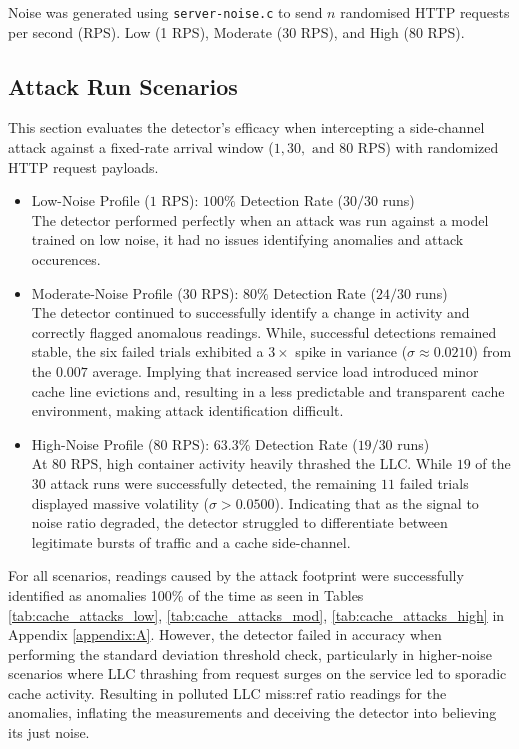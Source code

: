 \documentclass[11pt,a4paper, notitlepage]{article}
\begin{document}
Noise was generated using \texttt{server-noise.c} to send $n$ randomised HTTP requests per second (RPS). Low (1 RPS), Moderate (30 RPS), and High (80 RPS).

\subsection{Attack Run Scenarios}
This section evaluates the detector's efficacy when intercepting a side-channel attack against a fixed-rate arrival window ($1, 30, \text{ and } 80 \text{ RPS}$) with randomized HTTP request payloads.
\smallskip
\begin{itemize}[nosep]
    \item Low-Noise Profile ($1 \text{ RPS}$): $100\%$ Detection Rate ($30/30$ runs) \\
    The detector performed perfectly when an attack was run against a model trained on low noise, it had no issues identifying anomalies and 
    attack occurences.
    \smallskip
    \item Moderate-Noise Profile ($30 \text{ RPS}$): $80\%$ Detection Rate ($24/30$ runs) \\
    The detector continued to successfully identify a change in activity and correctly flagged anomalous readings. While, successful detections remained stable, the six failed trials exhibited a $3\times$ spike in variance ($\sigma \approx 0.0210$) from the $0.007$ average. 
    Implying that increased service load introduced minor cache line evictions and, resulting in a less predictable and transparent cache environment, making attack identification difficult.
    
    \item High-Noise Profile ($80 \text{ RPS}$): $63.3\%$ Detection Rate ($19/30$ runs) \\
    At $80 \text{ RPS}$, high container activity heavily thrashed the LLC. While $19$ of the 30 attack runs were successfully detected, the remaining $11$ failed trials displayed massive volatility ($\sigma > 0.0500$). Indicating that 
    as the signal to noise ratio degraded, the detector struggled to differentiate between legitimate bursts of traffic and a cache side-channel.
\end{itemize}
\medskip
For all scenarios, readings caused by the attack footprint were successfully identified as anomalies 100\% of the time as seen in Tables \ref{tab:cache_attacks_low}, \ref{tab:cache_attacks_mod}, \ref{tab:cache_attacks_high} in Appendix \ref{appendix:A}.
However, the detector failed in accuracy when performing the standard deviation threshold check, particularly in higher-noise scenarios where LLC thrashing from request surges on the service led to 
sporadic cache activity. Resulting in polluted LLC miss:ref ratio readings for the anomalies, inflating the measurements and deceiving the detector into
believing its just noise.
\end{document}
